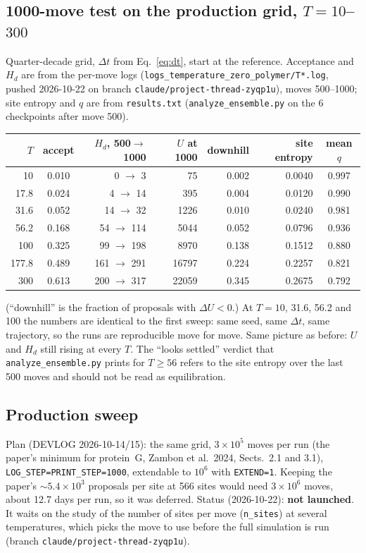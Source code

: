 \documentclass[11pt,a4paper]{article}
\newcommand{\dt}{\Delta t}
\newcommand{\Hd}{H_d}
\newcommand{\file}[1]{\texttt{#1}}
\begin{document}
\subsection{\texorpdfstring{1000-move test on the production grid, $T=10$--$300$}{1000-move test on the production grid, T=10-300}}
Quarter-decade grid, $\dt$ from Eq.~\eqref{eq:dt}, start at the reference.
Acceptance and $\Hd$ are from the per-move logs
(\file{logs\_temperature\_zero\_polymer/T*.log}, pushed 2026-10-22 on branch
\texttt{claude/project-thread-zyqp1u}), moves 500--1000; site entropy and $q$
are from \file{results.txt} (\file{analyze\_ensemble.py} on the 6 checkpoints
after move 500).
\begin{center}
\begin{tabular}{@{}rcrrrrc@{}}
\toprule
$T$ & accept & $\Hd$, 500$\to$1000 & $U$ at 1000 & downhill & site entropy & mean $q$ \\
\midrule
10    & 0.010 & 0 $\to$ 3     & 75     & 0.002 & 0.0040 & 0.997 \\
17.8  & 0.024 & 4 $\to$ 14    & 395    & 0.004 & 0.0120 & 0.990 \\
31.6  & 0.052 & 14 $\to$ 32   & 1226   & 0.010 & 0.0240 & 0.981 \\
56.2  & 0.168 & 54 $\to$ 114  & 5044   & 0.052 & 0.0796 & 0.936 \\
100   & 0.325 & 99 $\to$ 198  & 8970   & 0.138 & 0.1512 & 0.880 \\
177.8 & 0.489 & 161 $\to$ 291 & 16797  & 0.224 & 0.2257 & 0.821 \\
300   & 0.613 & 200 $\to$ 317 & 22059  & 0.345 & 0.2675 & 0.792 \\
\bottomrule
\end{tabular}
\end{center}
(``downhill'' is the fraction of proposals with $\Delta U<0$.) At $T=10$, 31.6,
56.2 and 100 the numbers are identical to the first sweep: same seed, same $\dt$,
same trajectory, so the runs are reproducible move for move. Same picture as
before: $U$ and $\Hd$ still rising at every $T$. The ``looks settled''
verdict that \file{analyze\_ensemble.py} prints for $T\ge56$ refers to the site
entropy over the last 500 moves and should not be read as equilibration.

\subsection{Production sweep}
Plan (DEVLOG 2026-10-14/15): the same grid, $3\times10^5$ moves per run (the
paper's minimum for protein~G, Zambon et al.\ 2024, Sects.~2.1 and 3.1),
\texttt{LOG\_STEP=PRINT\_STEP=1000}, extendable to $10^6$ with
\texttt{EXTEND=1}. Keeping the paper's $\sim5.4\times10^3$ proposals per site at
566 sites would need $3\times10^6$ moves, about 12.7 days per run, so it was
deferred. Status (2026-10-22): \textbf{not launched}. It waits on the study of
the number of sites per move (\texttt{n\_sites}) at several temperatures, which
picks the move to use before the full simulation is run (branch
\texttt{claude/project-thread-zyqp1u}).
\end{document}

